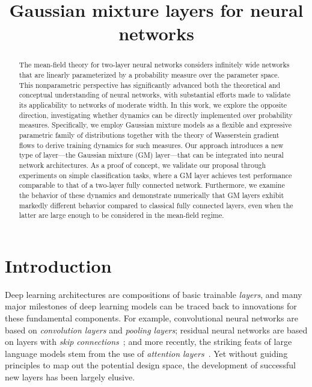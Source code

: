 \documentclass{custom}
\title[Gaussian mixture layers]{Gaussian mixture layers for neural networks}
\begin{document}
\maketitle


\begin{abstract}
The mean-field theory for two-layer neural networks considers infinitely wide networks that are linearly parameterized by a probability measure over the parameter space. This nonparametric perspective has significantly advanced both the theoretical and conceptual understanding of neural networks, with substantial efforts made to validate its applicability to networks of moderate width.
In this work, we explore the opposite direction, investigating whether dynamics can be directly implemented over probability measures. Specifically, we employ Gaussian mixture models as a flexible and expressive parametric family of distributions together with the theory of Wasserstein gradient flows to derive training dynamics for such measures. Our approach introduces a new type of layer---the Gaussian mixture (GM) layer---that can be integrated into neural network architectures.
As a proof of concept, we validate our proposal through experiments on simple classification tasks, where a GM layer achieves test performance comparable to that of a two-layer fully connected network. Furthermore, we examine the behavior of these dynamics and demonstrate numerically that GM layers exhibit markedly different behavior compared to classical fully connected layers, even when the latter are large enough to be considered in the mean-field regime.
\end{abstract}




\section{Introduction}\label{sec:intro}


Deep learning architectures are compositions of basic trainable \emph{layers}, and many major milestones of deep learning models can be traced back to innovations for these fundamental components.
For example, convolutional neural networks are based on \emph{convolution layers} and \emph{pooling layers}; residual neural networks are based on layers with \emph{skip connections}~\citep{He+16Res}; and more recently, the striking feats of large language models stem from the use of \emph{attention layers}~\citep{Vas+17Attention}.
Yet without guiding principles to map out the potential design space, the development of successful new layers has been largely elusive.
\end{document}
